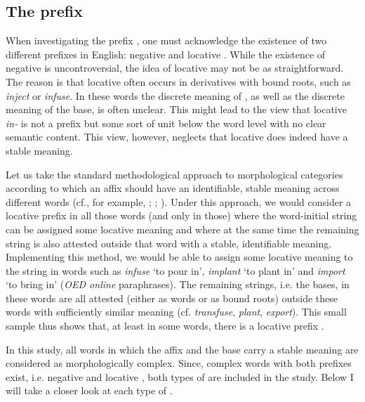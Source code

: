 \subsection{The prefix } \label{theory:in}

When investigating the prefix , one must acknowledge the existence of two different prefixes in English: negative  and locative . While the existence of negative  is uncontroversial, the idea of locative  may not be as straightforward. The reason is that locative  often occurs in derivatives with bound roots, such as \textit{inject} or \textit{infuse}. In these words the discrete meaning of , as well as the discrete meaning of the base, is often unclear. This might lead to the view that locative \textit{in-} is not a prefix but some sort of unit below the word level with  no clear semantic content. This view, however, neglects that locative  does indeed have a stable meaning.  

Let us take the standard methodological approach to morphological categories according to which an affix should have an identifiable, stable meaning across different words (cf., for example, \citealt[Chapter 5.2.2]{Plag.1999}; \citealt[63ff.]{Stockwell.2001}; \citealt[68]{Schulte.2015}). Under this approach, we would consider  a locative prefix in all those words (and only in those) where the word-initial string  can be assigned some locative meaning and where at the same time the remaining string is also attested outside that word with a stable, identifiable meaning.
Implementing this method, we would be able to assign some locative meaning to the string  in words such as \textit{infuse} `to pour in', \textit{implant} `to plant in' and \textit{import} `to bring in' (\textit{OED online} paraphrases). The remaining strings, i.e. the bases, in these words are all attested (either as words or as bound roots) outside these words with sufficiently similar meaning (cf. \textit{transfuse}, \textit{plant}, \textit{export}). This small sample thus shows that, at least in some words, there is a locative prefix . 


In this study, all words in which the affix and the base carry a stable meaning are considered as morphologically complex.  Since, complex words with both prefixes exist, i.e. negative and locative , both types of  are included in the study.  Below I will take a closer look at each type of .




